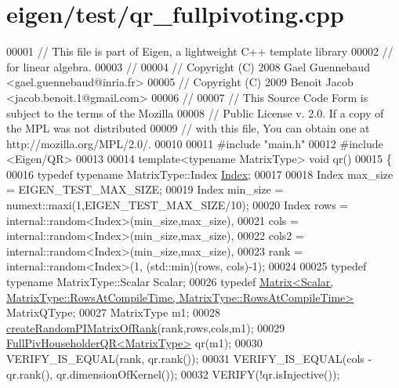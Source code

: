 \hypertarget{eigen_2test_2qr__fullpivoting_8cpp_source}{}\section{eigen/test/qr\+\_\+fullpivoting.cpp}
\label{eigen_2test_2qr__fullpivoting_8cpp_source}

\begin{DoxyCode}
00001 \textcolor{comment}{// This file is part of Eigen, a lightweight C++ template library}
00002 \textcolor{comment}{// for linear algebra.}
00003 \textcolor{comment}{//}
00004 \textcolor{comment}{// Copyright (C) 2008 Gael Guennebaud <gael.guennebaud@inria.fr>}
00005 \textcolor{comment}{// Copyright (C) 2009 Benoit Jacob <jacob.benoit.1@gmail.com>}
00006 \textcolor{comment}{//}
00007 \textcolor{comment}{// This Source Code Form is subject to the terms of the Mozilla}
00008 \textcolor{comment}{// Public License v. 2.0. If a copy of the MPL was not distributed}
00009 \textcolor{comment}{// with this file, You can obtain one at http://mozilla.org/MPL/2.0/.}
00010 
00011 \textcolor{preprocessor}{#include "main.h"}
00012 \textcolor{preprocessor}{#include <Eigen/QR>}
00013 
00014 \textcolor{keyword}{template}<\textcolor{keyword}{typename} MatrixType> \textcolor{keywordtype}{void} qr()
00015 \{
00016   \textcolor{keyword}{typedef} \textcolor{keyword}{typename} MatrixType::Index \hyperlink{namespace_eigen_a62e77e0933482dafde8fe197d9a2cfde}{Index};
00017 
00018   Index max\_size = EIGEN\_TEST\_MAX\_SIZE;
00019   Index min\_size = numext::maxi(1,EIGEN\_TEST\_MAX\_SIZE/10);
00020   Index rows  = internal::random<Index>(min\_size,max\_size),
00021         cols  = internal::random<Index>(min\_size,max\_size),
00022         cols2 = internal::random<Index>(min\_size,max\_size),
00023         rank  = internal::random<Index>(1, (std::min)(rows, cols)-1);
00024 
00025   \textcolor{keyword}{typedef} \textcolor{keyword}{typename} MatrixType::Scalar Scalar;
00026   \textcolor{keyword}{typedef} 
      \hyperlink{group___core___module_class_eigen_1_1_matrix}{Matrix<Scalar, MatrixType::RowsAtCompileTime, MatrixType::RowsAtCompileTime>}
       MatrixQType;
00027   MatrixType m1;
00028   \hyperlink{namespace_eigen_a0d9a7ddcee5c7c8defaba3628455efb2}{createRandomPIMatrixOfRank}(rank,rows,cols,m1);
00029   \hyperlink{group___q_r___module}{FullPivHouseholderQR<MatrixType>} qr(m1);
00030   VERIFY\_IS\_EQUAL(rank, qr.rank());
00031   VERIFY\_IS\_EQUAL(cols - qr.rank(), qr.dimensionOfKernel());
00032   VERIFY(!qr.isInjective());

\end{DoxyCode}
